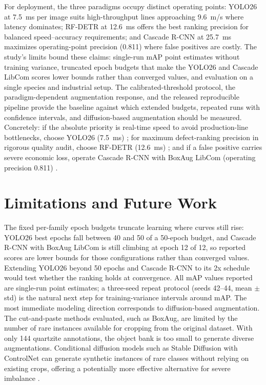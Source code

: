 \documentclass[pdflatex,sn-basic,Numbered,iicol]{sn-jnl}
\begin{document}
For deployment, the three paradigms occupy distinct operating points: YOLO26 at 7.5~ms per image suits high-throughput lines approaching 9.6~m/s where latency dominates; RF-DETR at 12.6~ms offers the best ranking precision for balanced speed--accuracy requirements; and Cascade R-CNN at 25.7~ms maximizes operating-point precision (0.811) where false positives are costly. The study's limits bound these claims: single-run mAP point estimates without training variance, truncated epoch budgets that make the YOLO26 and Cascade LibCom scores lower bounds rather than converged values, and evaluation on a single species and industrial setup. The calibrated-threshold protocol, the paradigm-dependent augmentation response, and the released reproducible pipeline provide the baseline against which extended budgets, repeated runs with confidence intervals, and diffusion-based augmentation should be measured. Concretely: if the absolute priority is real-time speed to avoid production-line bottlenecks, choose YOLO26 (7.5~ms) \citep{hussain2023yolo, Kodytek2022Dataset}; for maximum defect-ranking precision in rigorous quality audit, choose RF-DETR (12.6~ms) \citep{zhao2023detrs}; and if a false positive carries severe economic loss, operate Cascade R-CNN with BoxAug LibCom (operating precision 0.811) \citep{cai2018cascade}.


\section{Limitations and Future Work}
\label{sec:future}

The fixed per-family epoch budgets truncate learning where curves still rise: YOLO26 best epochs fall between 40 and 50 of a 50-epoch budget, and Cascade R-CNN with BoxAug LibCom is still climbing at epoch 12 of 12, so reported scores are lower bounds for those configurations rather than converged values. Extending YOLO26 beyond 50 epochs and Cascade R-CNN to its 2x schedule would test whether the ranking holds at convergence. All mAP values reported are single-run point estimates; a three-seed repeat protocol (seeds 42--44, mean $\pm$ std) is the natural next step for training-variance intervals around mAP. The most immediate modeling direction corresponds to diffusion-based augmentation. The cut-and-paste methods evaluated, such as BoxAug, are limited by the number of rare instances available for cropping from the original dataset. With only 144 quartzite annotations, the object bank is too small to generate diverse augmentations. Conditional diffusion models such as Stable Diffusion with ControlNet can generate synthetic instances of rare classes without relying on existing crops, offering a potentially more effective alternative for severe imbalance \citep{capogrosso2024diffusion}.
\end{document}
